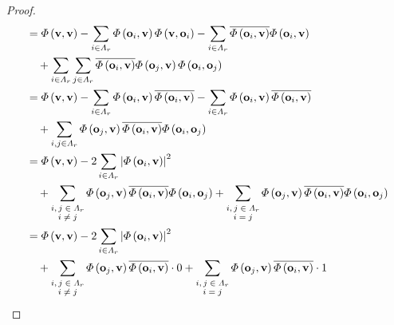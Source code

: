 \documentclass[dvipdfmx]{jsarticle}
\begin{document}
\begin{proof}
\begin{align*}
&= \varPhi \left( \mathbf{v,v} \right) - \sum_{i \in \varLambda_{r}} {\varPhi \left( \mathbf{o}_{i},\mathbf{v} \right)\varPhi \left( \mathbf{v},\mathbf{o}_{i} \right)} - \sum_{i \in \varLambda_{r}} {\overline{\varPhi \left( \mathbf{o}_{i},\mathbf{v} \right)}\varPhi \left( \mathbf{o}_{i},\mathbf{v} \right)} \\
&\quad + \sum_{i \in \varLambda_{r}} {\sum_{j \in \varLambda_{r}} {\overline{\varPhi \left( \mathbf{o}_{i},\mathbf{v} \right)}\varPhi \left( \mathbf{o}_{j},\mathbf{v} \right)\varPhi \left( \mathbf{o}_{i},\mathbf{o}_{j} \right)}}\\
&= \varPhi \left( \mathbf{v,v} \right) - \sum_{i \in \varLambda_{r}} {\varPhi \left( \mathbf{o}_{i},\mathbf{v} \right)\overline{\varPhi \left( \mathbf{o}_{i},\mathbf{v} \right)}} - \sum_{i \in \varLambda_{r}} {\varPhi \left( \mathbf{o}_{i},\mathbf{v} \right)\overline{\varPhi \left( \mathbf{o}_{i},\mathbf{v} \right)}} \\
&\quad + \sum_{i,j \in \varLambda_{r}} {\varPhi \left( \mathbf{o}_{j},\mathbf{v} \right)\overline{\varPhi \left( \mathbf{o}_{i},\mathbf{v} \right)}\varPhi \left( \mathbf{o}_{i},\mathbf{o}_{j} \right)}\\
&= \varPhi \left( \mathbf{v,v} \right) - 2\sum_{i \in \varLambda_{r}} \left| \varPhi \left( \mathbf{o}_{i},\mathbf{v} \right) \right|^{2} \\
&\quad + \sum_{\scriptsize \begin{matrix} i,j \in \varLambda_{r} \\i \neq j \\\end{matrix}} {\varPhi \left( \mathbf{o}_{j},\mathbf{v} \right)\overline{\varPhi \left( \mathbf{o}_{i},\mathbf{v} \right)}\varPhi \left( \mathbf{o}_{i},\mathbf{o}_{j} \right)} + \sum_{\scriptsize \begin{matrix} i,j \in \varLambda_{r} \\i = j \end{matrix}} {\varPhi \left( \mathbf{o}_{j},\mathbf{v} \right)\overline{\varPhi \left( \mathbf{o}_{i},\mathbf{v} \right)}\varPhi \left( \mathbf{o}_{i},\mathbf{o}_{j} \right)}\\
&= \varPhi \left( \mathbf{v,v} \right) - 2\sum_{i \in \varLambda_{r}} \left| \varPhi \left( \mathbf{o}_{i},\mathbf{v} \right) \right|^{2} \\
&\quad + \sum_{\scriptsize \begin{matrix} i,j \in \varLambda_{r} \\i \neq j \\\end{matrix}} {\varPhi \left( \mathbf{o}_{j},\mathbf{v} \right)\overline{\varPhi \left( \mathbf{o}_{i},\mathbf{v} \right)} \cdot 0} + \sum_{\scriptsize \begin{matrix} i,j \in \varLambda_{r} \\i = j \end{matrix}} {\varPhi \left( \mathbf{o}_{j},\mathbf{v} \right)\overline{\varPhi \left( \mathbf{o}_{i},\mathbf{v} \right)} \cdot 1}\\

\end{align*}
\end{proof}
\end{document}
